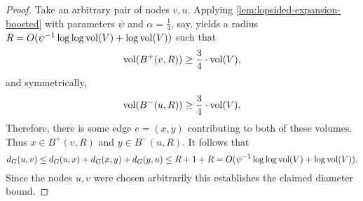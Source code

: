 \documentclass[letterpaper,11pt]{article}
\begin{document}
\lemLexpDiam*

\begin{proof}
	Take an arbitrary pair of nodes $v, u$. Applying \cref{lem:lopsided-expansion-boosted} with parameters $\psi$ and $\alpha = \frac{1}{4}$, say, yields a radius $R = O(\psi^{-1} \log\log \operatorname{vol}(V) + \log \operatorname{vol}(V))$ such that
	\begin{equation*}
		\operatorname{vol}(B^+(v, R)) \geq \frac{3}{4} \cdot \operatorname{vol}(V),
	\end{equation*}
	and symmetrically,
	\begin{equation*}
		\operatorname{vol}(B^-(u, R)) \geq \frac{3}{4} \cdot \operatorname{vol}(V).
	\end{equation*}
	Therefore, there is some edge $e = (x, y)$ contributing to both of these volumes. Thus $x \in B^+(v, R)$ and $y \in B^-(u, R)$. It follows that
	\begin{equation*}
		d_G(u, v) \leq d_G(u, x) + d_G(x, y) +  d_G(y, u) \leq R + 1 + R = O(\psi^{-1} \log\log \operatorname{vol}(V) + \log \operatorname{vol}(V)).
	\end{equation*}
	Since the nodes $u, v$ were chosen arbitrarily this establishes the claimed diameter bound.
\end{proof}
\end{document}
